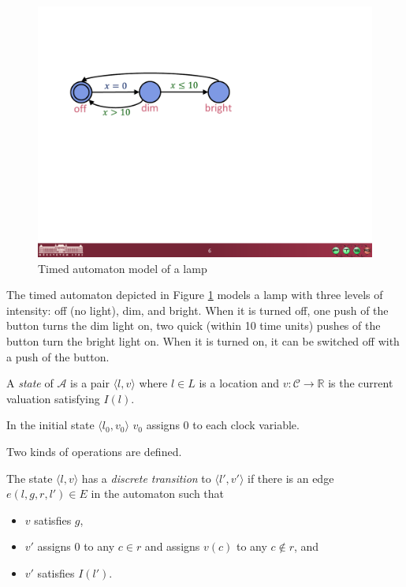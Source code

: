 \begin{figure}
	\centering
	\begin{minipage}{0.5\textwidth}
		\includegraphics[width=\textwidth]{include/figures/timed_lamp}%
		\caption{Timed automaton model of a lamp}
		\label{fig:lamp}
	\end{minipage}
\end{figure}

\begin{example}
	The timed automaton depicted in Figure \ref{fig:lamp} models a lamp with three levels of intensity: off (no light), dim, and bright. When it is turned off, one push of the button turns the dim light on, two quick (within 10 time units) pushes of the button turn the bright light on. When it is turned on, it can be switched off with a push of the button.
\end{example}

\begin{dfn}
	A \emph{state} of $\mathcal{A}$ is a pair $\langle l,v \rangle$ where $l \in L$ is a
	location and $v:\mathcal{C} \to \mathds{R}$ is the current valuation satisfying $I(l)$.
\end{dfn}
 In the initial state $\langle l_0,v_0 \rangle$ $v_0$ assigns 0 to each clock variable.

Two kinds of operations are defined.

\begin{dfn}
	 The state $\langle l,v \rangle$ has a
	 \emph{discrete transition} to $\langle l',v' \rangle$  if there is an
	 edge $e(l,g,r,l') \in E$ in the automaton such that 
	 \begin{itemize}
	 	\item $v$ satisfies $g$, 
	 	\item $v'$ assigns 0 to any $c \in r$ and assigns $v(c)$ to any $c \not\in r$, and
	 	\item $v'$ satisfies $I(l')$. 
	 \end{itemize}
\end{dfn}

